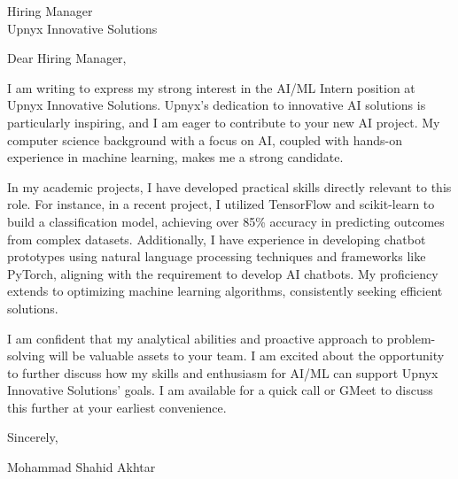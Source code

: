 \documentclass[11pt]{letter}
\date{\today}
\begin{document}
\begin{letter}{Hiring Manager\\
Upnyx Innovative Solutions}

\opening{Dear Hiring Manager,}

I am writing to express my strong interest in the AI/ML Intern position at Upnyx Innovative Solutions.  Upnyx's dedication to innovative AI solutions is particularly inspiring, and I am eager to contribute to your new AI project. My computer science background with a focus on AI, coupled with hands-on experience in machine learning, makes me a strong candidate.

In my academic projects, I have developed practical skills directly relevant to this role. For instance, in a recent project, I utilized TensorFlow and scikit-learn to build a classification model, achieving over 85\% accuracy in predicting outcomes from complex datasets.  Additionally, I have experience in developing chatbot prototypes using natural language processing techniques and frameworks like PyTorch, aligning with the requirement to develop AI chatbots.  My proficiency extends to optimizing machine learning algorithms, consistently seeking efficient solutions.

I am confident that my analytical abilities and proactive approach to problem-solving will be valuable assets to your team. I am excited about the opportunity to further discuss how my skills and enthusiasm for AI/ML can support Upnyx Innovative Solutions' goals.  I am available for a quick call or GMeet to discuss this further at your earliest convenience.

\closing{Sincerely,}

\vspace{0.4cm}
Mohammad Shahid Akhtar

\end{letter}
\end{document}
